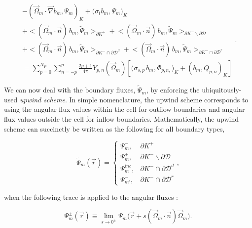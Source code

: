 \begin{equation}
\label{eq::Sn_DGFEM_trans_eq_cellK_diff_faces}
\begin{aligned}
- \left( \vec{\Omega}_m \cdot  \vec{\nabla} b_m, \Psi_{m} \right)_{K}   + \Big(  \sigma_{t} b_m ,   \Psi_{m} \Big)_{K}  \\
+  \Big< ( \vec{\Omega}_m \cdot \vec{n} ) \, b_m, \tilde{\Psi}_m  \Big>_{\partial K^+}  + \Big< ( \vec{\Omega}_m \cdot \vec{n} ) \, b_m, \tilde{\Psi}_m  \Big>_{\partial K^- \backslash \partial \mathcal{D}} \\
  + \Big< ( \vec{\Omega}_m \cdot \vec{n} ) \, b_m, \tilde{\Psi}_m  \Big>_{\partial K^- \cap \partial \mathcal{D}^d}  + \Big< ( \vec{\Omega}_m \cdot \vec{n} ) \, b_m, \tilde{\Psi}_m  \Big>_{\partial K^- \cap \partial \mathcal{D}^r}  \\
= \sum_{p=0}^{N_P} \sum_{n=-p}^{p} \frac{2p + 1}{4 \pi}  Y_{p,n} (  \vec{\Omega}_m ) \left[ \Big( \sigma_{s,p} \, b_m,  \Phi_{p,n,} \Big)_{K}  + \left(  b_m ,   Q_{p,n} \right)_{K} \right]
\end{aligned} .
\end{equation}

We can now deal with the boundary fluxes, $\tilde{\Psi}_m$, by enforcing the ubiquitously-used {\em upwind scheme}. In simple nomenclature, the upwind scheme corresponds to using the angular flux values within the cell for outflow boundaries and angular flux values outside the cell for inflow boundaries. Mathematically, the upwind scheme can succinctly be written as the following for all boundary types,

\begin{equation}
\label{eq::Sn_upwind_cases}
\tilde{\Psi}_m (\vec{r}) = \begin{cases}
\Psi_m^{-} , & \partial K^+ \\
\Psi_m^{+}, & \partial K^- \backslash \partial \mathcal{D} \\
\Psi_m^{inc}, & \partial K^- \cap \partial \mathcal{D}^d \\
\Psi_{m'}^{-}, & \partial K^- \cap \partial \mathcal{D}^r
\end{cases} ,
\end{equation}

\noindent when the following trace is applied to the angular fluxes :

\begin{equation}
\label{eq::Sn_ang_flux_trace}
\Psi_m^{\pm} (\vec{r}) \equiv \lim_{s \rightarrow 0^{\pm}} \Psi_m \Big( \vec{r} + s (\vec{\Omega}_m \cdot \vec{n}) \vec{\Omega}_m \Big) .
\end{equation}

